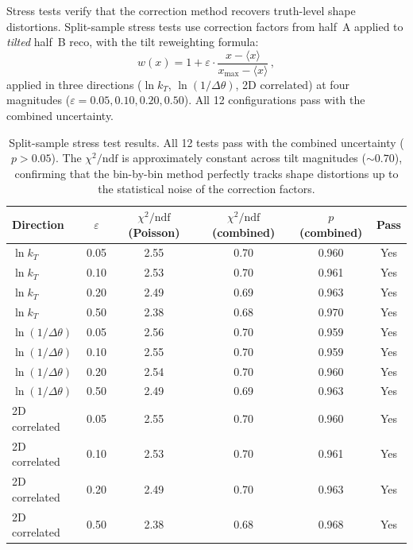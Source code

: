 \documentclass[11pt,a4paper]{article}
\begin{document}
Stress tests verify that the correction method recovers truth-level
shape distortions.  Split-sample stress tests use correction factors
from half~A applied to \emph{tilted} half~B reco, with the tilt
reweighting formula:
\begin{equation}
  w(x) = 1 + \varepsilon \cdot \frac{x - \langle x \rangle}
  {x_\text{max} - \langle x \rangle}\,,
  \label{eq:stress-tilt}
\end{equation}
applied in three directions ($\ln k_T$, $\ln(1/\Delta\theta)$,
2D correlated) at four magnitudes ($\varepsilon = 0.05, 0.10, 0.20,
0.50$).  All 12 configurations pass with the combined uncertainty.

\begin{table}[htbp]
\centering
\caption{Split-sample stress test results.  All 12 tests pass
  with the combined uncertainty ($p > 0.05$).  The $\chi^2/\text{ndf}$
  is approximately constant across tilt magnitudes ($\sim\!0.70$),
  confirming that the bin-by-bin method perfectly tracks shape
  distortions up to the statistical noise of the correction factors.}
\label{tbl:stress}
\begin{tabular}{lccccc}
\toprule
Direction & $\varepsilon$ & $\chi^2/\text{ndf}$ (Poisson) &
  $\chi^2/\text{ndf}$ (combined) & $p$ (combined) & Pass \\
\midrule
$\ln k_T$ & 0.05 & 2.55 & 0.70 & 0.960 & Yes \\
$\ln k_T$ & 0.10 & 2.53 & 0.70 & 0.961 & Yes \\
$\ln k_T$ & 0.20 & 2.49 & 0.69 & 0.963 & Yes \\
$\ln k_T$ & 0.50 & 2.38 & 0.68 & 0.970 & Yes \\
$\ln(1/\Delta\theta)$ & 0.05 & 2.56 & 0.70 & 0.959 & Yes \\
$\ln(1/\Delta\theta)$ & 0.10 & 2.55 & 0.70 & 0.959 & Yes \\
$\ln(1/\Delta\theta)$ & 0.20 & 2.54 & 0.70 & 0.960 & Yes \\
$\ln(1/\Delta\theta)$ & 0.50 & 2.49 & 0.69 & 0.963 & Yes \\
2D correlated & 0.05 & 2.55 & 0.70 & 0.960 & Yes \\
2D correlated & 0.10 & 2.53 & 0.70 & 0.961 & Yes \\
2D correlated & 0.20 & 2.49 & 0.70 & 0.963 & Yes \\
2D correlated & 0.50 & 2.38 & 0.68 & 0.968 & Yes \\
\bottomrule
\end{tabular}
\end{table}
\end{document}
